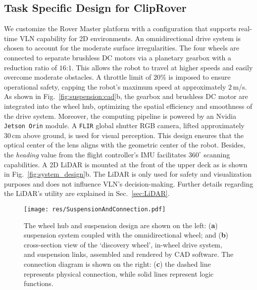\subsection{Task Specific Design for ClipRover}
We customize the Rover Master platform with a configuration that supports real-time VLN capability for 2D environments. An omnidirectional drive system is chosen to account for the moderate surface irregularities. The four wheels are connected to separate brushless DC motors via a planetary gearbox with a reduction ratio of $16$:$1$. This allows the robot to travel at higher speeds and easily overcome moderate obstacles. A throttle limit of $20$\% is imposed to ensure operational safety, capping the robot's maximum speed at approximately $2$\,m/s. As shown in Fig.~\ref{fig:suspension:cad}b, the gearbox and brushless DC motor are integrated into the wheel hub, optimizing the spatial efficiency and smoothness of the drive system. Moreover, the computing pipeline is powered by an Nvidia {\tt Jetson Orin} module. A {\tt FLIR} global shutter RGB camera, lifted approximately $30$\,cm above ground, is used for visual perception. This design ensures that the optical center of the lens aligns with the geometric center of the robot. Besides, the \textit{heading} value from the flight controller's IMU facilitates $360^{\circ}$ scanning capabilities. A 2D LiDAR is mounted at the front of the upper deck as is shown in Fig.~\ref{fig:system_design}b. The LiDAR is only used for safety and visualization purposes and does not influence VLN's decision-making. Further details regarding the LiDAR's utility are explained in Sec.~\ref{sec:LiDAR}.

\begin{figure}
    \centering
    \texttt{[image: res/SuspensionAndConnection.pdf]}%
    \vspace{-1mm}
    \caption{
        The wheel hub and suspension design are shown on the left: (\textbf{a}) suspension system coupled with the omnidirectional wheel; and (\textbf{b}) cross-section view of the `discovery wheel', in-wheel drive system, and suspension links, assembled and rendered by CAD software. The connection diagram is shown on the right: (\textbf{c}) the dashed line represents physical connection, while solid lines represent logic functions.
    }%
    \label{fig:suspension:cad}
    \label{fig:connection}
    \vspace{-2mm}
\end{figure}

